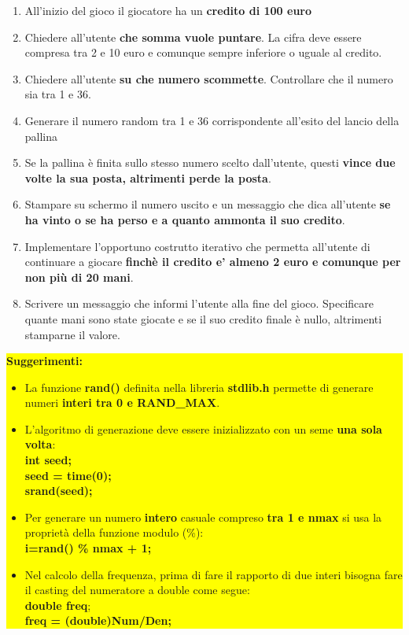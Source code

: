 \documentclass[12pt]{article}
\begin{document}
\begin{enumerate}

\item All'inizio del gioco il giocatore ha un \textbf{credito di 100 euro} 

\item Chiedere all'utente \textbf{che somma vuole puntare}. La cifra deve essere compresa tra 2 e 10 euro e comunque sempre inferiore o uguale al credito. 

\item Chiedere all'utente \textbf{su che numero scommette}. Controllare che il numero sia tra 1 e 36.

\item Generare il numero random tra 1 e 36 corrispondente all'esito del lancio della pallina

\item Se la pallina \`e finita sullo stesso numero scelto dall'utente, questi \textbf{vince due volte la sua posta, altrimenti perde la posta}.

\item Stampare su schermo il numero uscito e un messaggio che dica all'utente \textbf{se ha vinto o se ha perso e a quanto ammonta il suo credito}.

\item Implementare l'opportuno costrutto iterativo che permetta all'utente di continuare a giocare \textbf{finch\`e il credito e' almeno 2 euro e comunque per non pi\`u di 20 mani}.

\item Scrivere un messaggio che informi l'utente alla fine del gioco. Specificare quante mani sono state giocate e se il suo credito finale \`e nullo, altrimenti stamparne il valore.
\end{enumerate}
\vspace{2cm}

\colorbox{yellow}{\begin{minipage}{17cm}

\textbf{Suggerimenti:}
\begin{itemize}
\item La funzione \textbf{rand()} definita nella libreria \textbf{stdlib.h} permette di generare numeri \textbf{interi tra 0 e RAND\_MAX}.
\item L'algoritmo di generazione deve essere inizializzato con un seme \textbf{una sola volta}:\\
\textbf{int seed;\\
seed  = time(0);\\
srand(seed);}
\item Per generare un numero \textbf{intero} casuale compreso \textbf{tra 1 e nmax} si usa la proprietà della funzione modulo (\%):\\
\textbf{i=rand() \% nmax + 1;}
\item Nel calcolo della frequenza, prima di fare il rapporto di due interi bisogna fare il casting del numeratore a double come segue:\\
\textbf{double freq};\\
\textbf{freq = (double)Num/Den;}

\end{itemize}
\end{minipage}}


\vspace{2mm}
\end{document}
